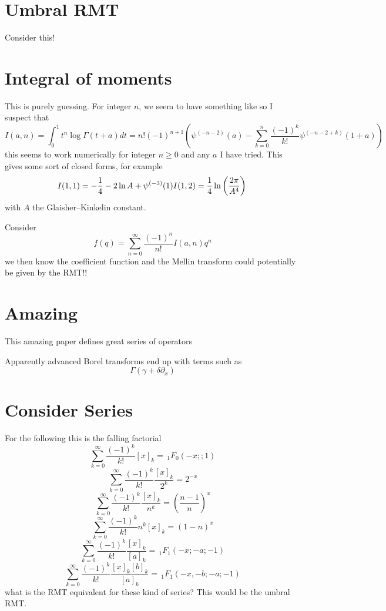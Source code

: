 \documentclass{article}
\begin{document}
\section{Umbral RMT}
Consider this!


\section{Integral of moments}
This is purely guessing. For integer $n$, we seem to have something like
so I suspect that 
$$
I(a,n)=\int_0^1 t^n\log\Gamma(t+a)dt = n!(-1)^{n+1}\left( \psi^{(-n-2)}(a) -\sum_{k=0}^n \frac{(-1)^k}{k!}\psi^{(-n-2+k)}(1+a) \right)
$$
this seems to work numerically for integer $n\ge 0$ and any $a$ I have tried. This gives some sort of closed forms, for example
$$
I(1,1) = -\frac{1}{4} - 2 \ln A + \psi^{(-3)}(1)\\
I(1,2) = \frac{1}{4}\ln\left(\frac{2\pi}{A^4}\right)\\
$$
with $A$ the Glaisher–Kinkelin constant.

Consider
$$
f(q) = \sum_{n=0}^\infty \frac{(-1)^n}{n!} I(a,n) q^n 
$$
we then know the coefficient function and the Mellin transform could potentially be given by the RMT!!





\section{Amazing}
This amazing paper defines great series of operators 

Apparently advanced Borel transforms end up with terms such as 
$$
\Gamma(\gamma + \delta \partial_x)
$$


\section{Consider Series}
For the following this is the falling factorial
$$
\sum_{k=0}^\infty \frac{(-1)^k}{k!} [x]_k = \,_1F_0(-x;;1)
$$
$$
\sum_{k=0}^\infty \frac{(-1)^k}{k!} \frac{[x]_k}{2^k} = 2^{-x}
$$
$$
\sum_{k=0}^\infty \frac{(-1)^k}{k!} \frac{[x]_k}{n^k} = \left(\frac{n-1}{n}\right)^x
$$
$$
\sum_{k=0}^\infty \frac{(-1)^k}{k!} n^k [x]_k = \left(1-n\right)^x
$$
$$
\sum_{k=0}^\infty \frac{(-1)^k}{k!} \frac{[x]_k}{[a]_k} = \,_1F_1(-x;-a;-1)
$$
$$
\sum_{k=0}^\infty \frac{(-1)^k}{k!} \frac{[x]_k [b]_k}{[a]_k} = \,_1F_1(-x,-b;-a;-1)
$$
what is the RMT equivalent for these kind of series? This would be the umbral RMT.
\end{document}
